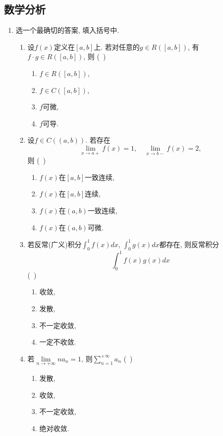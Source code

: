 \documentclass[12pt,a4paper,openany]{book}
\begin{document}
\subsection{数学分析}
\begin{enumerate}
\item 选一个最确切的答案, 填入括号中.
\begin{enumerate}
\item 设$f(x)$定义在$[a, b]$上. 若对任意的$g \in R([a, b])$, 有$f \cdot g \in R([a, b])$, 则 \hfill(\ )
\begin{enumerate}
\item $f \in R([a, b])$,
\item $f \in C([a, b])$,
\item $f$可微,
\item $f$可导.
\end{enumerate}

\item 设$f \in C((a, b))$. 若存在
\[
\lim_{x \rightarrow a+}{f(x)} = 1, \quad \lim_{x \rightarrow b-}{f(x)} = 2,
\]
则 \hfill (\ )
\begin{enumerate}
\item $f(x)$在$[a, b]$一致连续,
\item $f(x)$在$[a, b]$连续,
\item $f(x)$在$(a, b)$一致连续,
\item $f(x)$在$(a, b)$可微.
\end{enumerate}

\item 若反常(广义)积分$\displaystyle\int_{0}^{1}{f(x)dx}$, $\displaystyle\int_{0}^{1}{g(x)dx}$都存在, 则反常积分
\[
\int_{0}^{1}{f(x)g(x)dx}
\]
\hfill (\ )
\begin{enumerate}
\item 收敛,
\item 发散,
\item 不一定收敛,
\item 一定不收敛.
\end{enumerate}

\item 若$\lim\limits_{n \rightarrow +\infty}{na_n} = 1$, 则$\sum\limits_{n=1}^{+\infty}{a_n}$ \hfill (\ )
\begin{enumerate}
\item 发散,
\item 收敛,
\item 不一定收敛,
\item 绝对收敛.
\end{enumerate}


\end{enumerate}
\end{enumerate}
\end{document}
